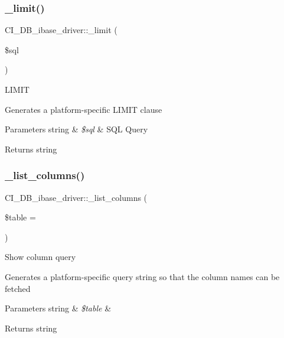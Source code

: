 \subsubsection{\texorpdfstring{\+\_\+limit()}{\_limit()}}
{\footnotesize\ttfamily C\+I\+\_\+\+D\+B\+\_\+ibase\+\_\+driver\+::\+\_\+limit (\begin{DoxyParamCaption}\item[{}]{\$sql }\end{DoxyParamCaption})\hspace{0.3cm}{\ttfamily [protected]}}

L\+I\+M\+IT

Generates a platform-\/specific L\+I\+M\+IT clause


\begin{DoxyParams}[1]{Parameters}
string & {\em \$sql} & S\+QL Query \\
\hline
\end{DoxyParams}
\begin{DoxyReturn}{Returns}
string 
\end{DoxyReturn}
\mbox{\label{class_c_i___d_b__ibase__driver_a691ad3e25c89cb26a96ab3b4c43fb154}} 
\subsubsection{\texorpdfstring{\+\_\+list\+\_\+columns()}{\_list\_columns()}}
{\footnotesize\ttfamily C\+I\+\_\+\+D\+B\+\_\+ibase\+\_\+driver\+::\+\_\+list\+\_\+columns (\begin{DoxyParamCaption}\item[{}]{\$table = {\ttfamily \textquotesingle{}\textquotesingle{}} }\end{DoxyParamCaption})\hspace{0.3cm}{\ttfamily [protected]}}

Show column query

Generates a platform-\/specific query string so that the column names can be fetched


\begin{DoxyParams}[1]{Parameters}
string & {\em \$table} & \\
\hline
\end{DoxyParams}
\begin{DoxyReturn}{Returns}
string 
\end{DoxyReturn}
\mbox{\label{class_c_i___d_b__ibase__driver_abe5944de9cc2ea53c4fbd25d32f9f4f9}} 
